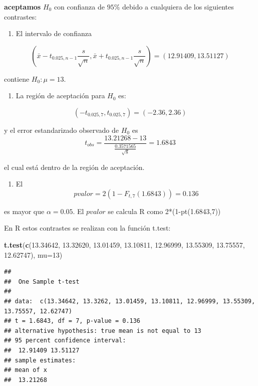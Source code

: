 \documentclass[
]{book}
\newenvironment{Shaded}{\begin{snugshade}}{\end{snugshade}}
\newcommand{\AttributeTok}[1]{\textcolor[rgb]{0.13,0.29,0.53}{#1}}
\newcommand{\DecValTok}[1]{\textcolor[rgb]{0.00,0.00,0.81}{#1}}
\newcommand{\FloatTok}[1]{\textcolor[rgb]{0.00,0.00,0.81}{#1}}
\newcommand{\FunctionTok}[1]{\textcolor[rgb]{0.13,0.29,0.53}{\textbf{#1}}}
\newcommand{\NormalTok}[1]{#1}
\providecommand{\tightlist}{%
  \setlength{\itemsep}{0pt}\setlength{\parskip}{0pt}}
\begin{document}
\textbf{aceptamos} \(H_0\) con confianza de \(95\%\) debido a cualquiera de los siguientes contrastes:

\begin{enumerate}
\def\labelenumi{\arabic{enumi}.}
\tightlist
\item
  El intervalo de confianza
\end{enumerate}

\[(\bar{x}-t_{0.025, n-1} \frac{s}{\sqrt{n}}, \bar{x}+t_{0.025, n-1} \frac{s}{ \sqrt{n}})=(12.91409, 13.51127)\]

contiene \(H_0:\mu=13\).

\begin{enumerate}
\def\labelenumi{\arabic{enumi}.}
\setcounter{enumi}{1}
\tightlist
\item
  La región de aceptación para \(H_0\) es:
\end{enumerate}

\[(-t_{0.025,7}, t_{0.025,7})=( -2.36, 2.36)\]

y el error estandarizado observado de \(H_0\) es
\[t_{obs} = \frac{13.21268-13}{\frac{0.3571565}{\sqrt{8}}}=1.6843\]

el cual está dentro de la región de aceptación.

\begin{enumerate}
\def\labelenumi{\arabic{enumi}.}
\setcounter{enumi}{2}
\tightlist
\item
  El \[pvalor=2(1-F_{t,7}(1.6843))=0.136\]
\end{enumerate}

es mayor que \(\alpha=0.05\). El \(pvalor\) se calcula R como 2*(1-pt(1.6843,7))

En R estos contrastes se realizan con la función t.test:

\begin{Shaded}
\begin{Highlighting}[]
\FunctionTok{t.test}\NormalTok{(}\FunctionTok{c}\NormalTok{(}\FloatTok{13.34642}\NormalTok{, }\FloatTok{13.32620}\NormalTok{, }\FloatTok{13.01459}\NormalTok{, }\FloatTok{13.10811}\NormalTok{,}
         \FloatTok{12.96999}\NormalTok{, }\FloatTok{13.55309}\NormalTok{, }\FloatTok{13.75557}\NormalTok{, }\FloatTok{12.62747}\NormalTok{), }
       \AttributeTok{mu=}\DecValTok{13}\NormalTok{)}
\end{Highlighting}
\end{Shaded}

\begin{verbatim}
## 
##  One Sample t-test
## 
## data:  c(13.34642, 13.3262, 13.01459, 13.10811, 12.96999, 13.55309, 13.75557, 12.62747)
## t = 1.6843, df = 7, p-value = 0.136
## alternative hypothesis: true mean is not equal to 13
## 95 percent confidence interval:
##  12.91409 13.51127
## sample estimates:
## mean of x 
##  13.21268
\end{verbatim}
\end{document}
